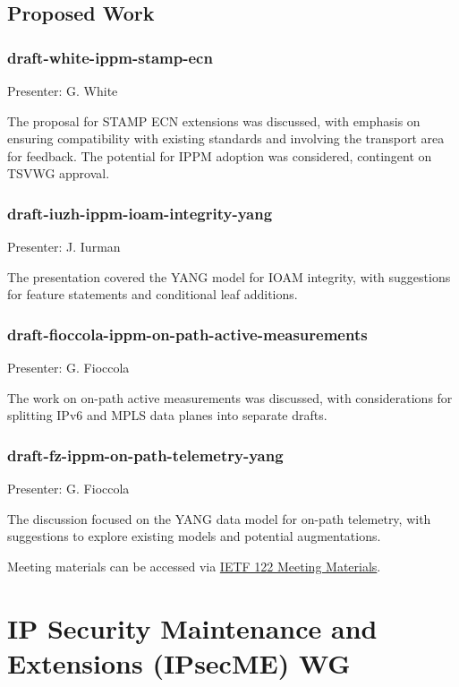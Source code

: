 \documentclass{article}
\begin{document}
\subsection{Proposed Work}

\subsubsection{draft-white-ippm-stamp-ecn}
Presenter: G. White

The proposal for STAMP ECN extensions was discussed, with emphasis on ensuring compatibility with existing standards and involving the transport area for feedback. The potential for IPPM adoption was considered, contingent on TSVWG approval.

\subsubsection{draft-iuzh-ippm-ioam-integrity-yang}
Presenter: J. Iurman

The presentation covered the YANG model for IOAM integrity, with suggestions for feature statements and conditional leaf additions.

\subsubsection{draft-fioccola-ippm-on-path-active-measurements}
Presenter: G. Fioccola

The work on on-path active measurements was discussed, with considerations for splitting IPv6 and MPLS data planes into separate drafts.

\subsubsection{draft-fz-ippm-on-path-telemetry-yang}
Presenter: G. Fioccola

The discussion focused on the YANG data model for on-path telemetry, with suggestions to explore existing models and potential augmentations.

Meeting materials can be accessed via \href{https://datatracker.ietf.org/meeting/122/materials.html}{IETF 122 Meeting Materials}.




\newpage

\section{IP Security Maintenance and Extensions (IPsecME) WG}
\end{document}
